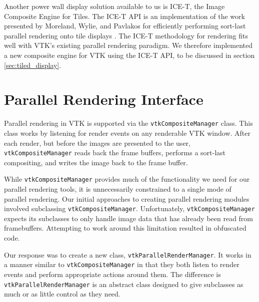 \documentclass[twocolumn]{article}
\newcommand{\cidentifier}[1]{\texttt{#1}}
\begin{document}
  Another power wall display solution available to us is ICE-T, the Image
  Composite Engine for Tiles.  The ICE-T API is an implementation of the
  work presented by Moreland, Wylie, and Pavlakos for efficiently
  performing sort-last parallel rendering onto tile displays
  \cite{Moreland01}.  The ICE-T methodology for rendering fits well with
  VTK's existing parallel rendering paradigm.  We therefore implemented a
  new composite engine for VTK using the ICE-T API, to be discussed in
  section \ref{sec:tiled_display}.


  \section{Parallel Rendering Interface}
  \label{sec:parallel_rendering_interface}

  Parallel rendering in VTK is supported via the
  \cidentifier{vtk\-Composite\-Manager} class.  This class works by
  listening for render events on any renderable VTK window.  After each
  render, but before the images are presented to the user,
  \cidentifier{vtk\-Composite\-Manager} reads back the frame buffers,
  performs a sort-last compositing, and writes the image back to the frame
  buffer.

  While \cidentifier{vtk\-Composite\-Manager} provides much of the
  functionality we need for our parallel rendering tools, it is
  unnecessarily constrained to a single mode of parallel rendering.  Our
  initial approaches to creating parallel rendering modules involved
  subclassing \cidentifier{vtk\-Composite\-Manager}.  Unfortunately,
  \cidentifier{vtk\-Composite\-Manager} expects its subclasses to only
  handle image data that has already been read from framebuffers.
  Attempting to work around this limitation resulted in obfuscated code.

  Our response was to create a new class,
  \cidentifier{vtk\-Parallel\-Render\-Manager}.  It works in a manner
  similar to \cidentifier{vtk\-Composite\-Manager} in that they both listen
  to render events and perform appropriate actions around them.  The
  difference is \cidentifier{vtk\-Parallel\-Render\-Manager} is an abstract
  class designed to give subclasses as much or as little control as they
  need.
\end{document}
